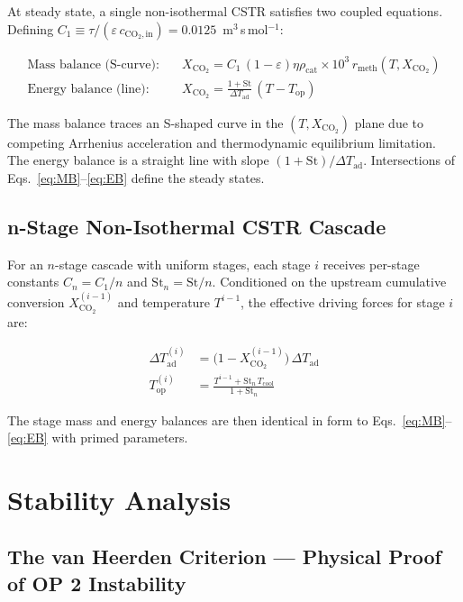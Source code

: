 \documentclass[11pt,a4paper]{article}
\newcommand{\dTad}{\Delta T_{\mathrm{ad}}}
\newcommand{\Xco}{X_{\mathrm{CO_2}}}
\newcommand{\Tcool}{T_{\mathrm{cool}}}
\newcommand{\Top}{T_{\mathrm{op}}}
\newcommand{\St}{\mathrm{St}}
\newcommand{\eps}{\varepsilon}
\newcommand{\cin}{c_{\mathrm{CO_2,in}}}
\begin{document}
At steady state, a single non-isothermal CSTR satisfies two coupled equations.
Defining $C_1 \equiv \tau/(\eps\,\cin) = 0.0125$~m$^3$\,s\,mol$^{-1}$:

\begin{align}
  \text{Mass balance (S-curve):}\quad &
  \Xco = C_1\,(1-\eps)\eta\rho_{\mathrm{cat}}\times10^3\,
         r_{\mathrm{meth}}(T,\Xco)
  \label{eq:MB} \\[4pt]
  \text{Energy balance (line):}\quad &
  \Xco = \frac{1+\St}{\dTad}\,(T - \Top)
  \label{eq:EB}
\end{align}

The mass balance traces an S-shaped curve in the $(T,\Xco)$ plane due to
competing Arrhenius acceleration and thermodynamic equilibrium limitation.
The energy balance is a straight line with slope $(1+\St)/\dTad$.
Intersections of Eqs.~\eqref{eq:MB}--\eqref{eq:EB} define the steady states.

\subsection{n-Stage Non-Isothermal CSTR Cascade}
\label{sec:cascade}

For an $n$-stage cascade with uniform stages, each stage $i$ receives
per-stage constants $C_n = C_1/n$ and $\St_n = \St/n$.
Conditioned on the upstream cumulative conversion $\Xco^{(i-1)}$ and
temperature $T^{i-1}$, the effective driving forces for stage $i$ are:

\begin{align}
  \dTad^{(i)} &= \bigl(1 - \Xco^{(i-1)}\bigr)\,\dTad
  \label{eq:dTad_stage} \\[3pt]
  T_{\mathrm{op}}^{(i)} &= \frac{T^{i-1} + \St_n\,\Tcool}{1+\St_n}
  \label{eq:Top_stage}
\end{align}

The stage mass and energy balances are then identical in form to
Eqs.~\eqref{eq:MB}--\eqref{eq:EB} with primed parameters.

\section{Stability Analysis}
\label{sec:stability}

\subsection{The van Heerden Criterion — Physical Proof of OP 2 Instability}
\label{sec:vanheerden}
\end{document}
